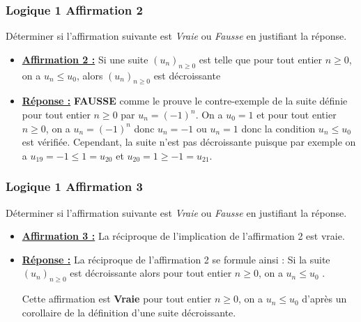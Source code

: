 \documentclass[11pt, hyperref={urlcolor=red,%
            linkcolor=blue, %
            colorlinks=true}]{beamer}
\newcommand{\Suite}[2]{\ensuremath{\left(#1\right)_{#2}}}
\begin{document}
\begin{frame}
\frametitle{Logique 1 Affirmation 2}

Déterminer si l'affirmation suivante est  \textit{Vraie} ou \textit{Fausse} en justifiant la réponse. 



\begin{itemize}
    \item \underline{\textbf{Affirmation 2 :}}
Si une suite $\Suite{u_{n}}{n\geqslant 0}$ est telle que pour tout entier $n \geqslant 0$, on a $u_{n} \leqslant u_{0}$, alors $\Suite{u_{n}}{n\geqslant 0}$ est décroissante

\pause \item  \underline{\textbf{Réponse :}} \textbf{ FAUSSE} comme le prouve le contre-exemple de la suite définie pour tout entier $n \geqslant 0$ par $u_{n}=(-1)^{n}$.  On a $u_{0}=1$ et pour tout entier $n \geqslant 0$, on a $u_{n}=(-1)^{n}$ donc $u_{n} = -1$ ou $u_{n}=1$ donc la condition $u_{n} \leqslant u_{0}$ est vérifiée. Cependant, la suite n'est pas décroissante puisque par exemple on a $u_{19}=-1 \leqslant 1=u_{20}$ et $u_{20}=1 \geqslant -1=u_{21}$.
\end{itemize}
	

\end{frame}


	
	
\begin{frame}
\frametitle{Logique 1 Affirmation 3}

Déterminer si l'affirmation suivante est  \textit{Vraie} ou \textit{Fausse} en justifiant la réponse. 



\begin{itemize}
    \item \underline{\textbf{Affirmation 3 :}}
La réciproque de l'implication de l'affirmation 2 est vraie.

\pause \item  \underline{\textbf{Réponse :}}  La réciproque de l'affirmation 2 se formule ainsi :    \og{}Si la suite $\Suite{u_{n}}{n\geqslant 0}$ est décroissante alors pour tout entier $n \geqslant 0$, on a $u_{n} \leqslant u_{0}$ \fg{}.

Cette affirmation est \textbf{Vraie} pour tout entier $n \geqslant 0$, on a $u_{n} \leqslant u_{0}$ d'après un corollaire de la définition d'une suite décroissante.
\end{itemize}
	

\end{frame}
\end{document}
